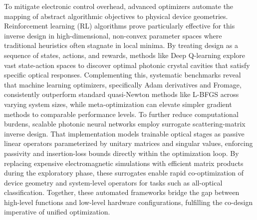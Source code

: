 \documentclass[11pt]{article}
\begin{document}
To mitigate electronic control overhead, advanced optimizers automate the mapping of abstract algorithmic objectives to physical device geometries. Reinforcement learning (RL) algorithms prove particularly effective for this inverse design in high-dimensional, non-convex parameter spaces where traditional heuristics often stagnate in local minima. By treating design as a sequence of states, actions, and rewards, methods like Deep Q-learning explore vast state-action spaces to discover optimal photonic crystal cavities that satisfy specific optical responses. \citep{doi_10_1515_nanoph_2022_0692_4b166807} Complementing this, systematic benchmarks reveal that machine learning optimizers, specifically Adam derivatives and Fromage, consistently outperform standard quasi-Newton methods like L-BFGS across varying system sizes, while meta-optimization can elevate simpler gradient methods to comparable performance levels. To further reduce computational burdens, scalable photonic neural networks employ surrogate scattering-matrix inverse design. That implementation models trainable optical stages as passive linear operators parameterized by unitary matrices and singular values, enforcing passivity and insertion-loss bounds directly within the optimization loop. \citep{s2_753a5d83a96e0194da93bcb6f20fa0bd356e37fa_c11e3796} By replacing expensive electromagnetic simulations with efficient matrix products during the exploratory phase, these surrogates enable rapid co-optimization of device geometry and system-level operators for tasks such as all-optical classification. Together, these automated frameworks bridge the gap between high-level functions and low-level hardware configurations, fulfilling the co-design imperative of unified optimization. \citep{doi_10_1515_nanoph_2022_0692_4b166807} \citep{doi_10_1063_5_0238444_48bf2cbe} \citep{s2_753a5d83a96e0194da93bcb6f20fa0bd356e37fa_c11e3796}
\end{document}
